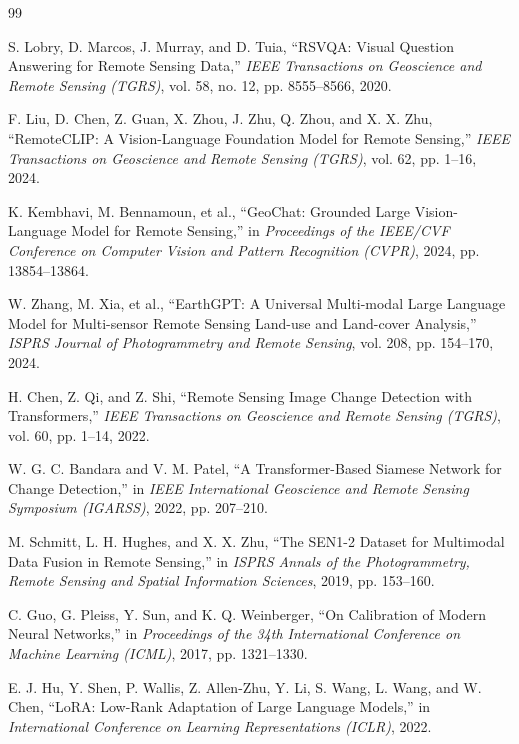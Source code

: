 \documentclass[12pt,a4paper]{report}
\begin{document}
\begin{thebibliography}{99}
\renewcommand{\bibname}{References}

 S. Lobry, D. Marcos, J. Murray, and D. Tuia, ``RSVQA: Visual Question Answering for Remote Sensing Data,'' \textit{IEEE Transactions on Geoscience and Remote Sensing (TGRS)}, vol. 58, no. 12, pp. 8555--8566, 2020.

 F. Liu, D. Chen, Z. Guan, X. Zhou, J. Zhu, Q. Zhou, and X. X. Zhu, ``RemoteCLIP: A Vision-Language Foundation Model for Remote Sensing,'' \textit{IEEE Transactions on Geoscience and Remote Sensing (TGRS)}, vol. 62, pp. 1--16, 2024.

 K. Kembhavi, M. Bennamoun, et al., ``GeoChat: Grounded Large Vision-Language Model for Remote Sensing,'' in \textit{Proceedings of the IEEE/CVF Conference on Computer Vision and Pattern Recognition (CVPR)}, 2024, pp. 13854--13864.

 W. Zhang, M. Xia, et al., ``EarthGPT: A Universal Multi-modal Large Language Model for Multi-sensor Remote Sensing Land-use and Land-cover Analysis,'' \textit{ISPRS Journal of Photogrammetry and Remote Sensing}, vol. 208, pp. 154--170, 2024.

 H. Chen, Z. Qi, and Z. Shi, ``Remote Sensing Image Change Detection with Transformers,'' \textit{IEEE Transactions on Geoscience and Remote Sensing (TGRS)}, vol. 60, pp. 1--14, 2022.

 W. G. C. Bandara and V. M. Patel, ``A Transformer-Based Siamese Network for Change Detection,'' in \textit{IEEE International Geoscience and Remote Sensing Symposium (IGARSS)}, 2022, pp. 207--210.

 M. Schmitt, L. H. Hughes, and X. X. Zhu, ``The SEN1-2 Dataset for Multimodal Data Fusion in Remote Sensing,'' in \textit{ISPRS Annals of the Photogrammetry, Remote Sensing and Spatial Information Sciences}, 2019, pp. 153--160.

 C. Guo, G. Pleiss, Y. Sun, and K. Q. Weinberger, ``On Calibration of Modern Neural Networks,'' in \textit{Proceedings of the 34th International Conference on Machine Learning (ICML)}, 2017, pp. 1321--1330.

 E. J. Hu, Y. Shen, P. Wallis, Z. Allen-Zhu, Y. Li, S. Wang, L. Wang, and W. Chen, ``LoRA: Low-Rank Adaptation of Large Language Models,'' in \textit{International Conference on Learning Representations (ICLR)}, 2022.


\end{thebibliography}
\end{document}

